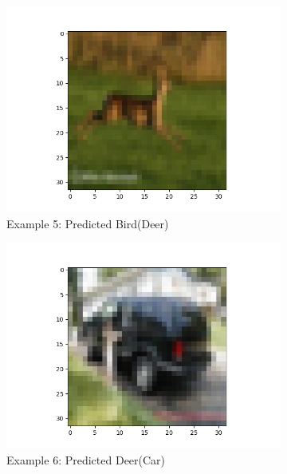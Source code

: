 \documentclass[11pt]{article}
\begin{document}
\begin{figure}[H]
\begin{subfigure}[b]{0.3\textwidth}
        \includegraphics[width=\linewidth]{misA5.png}
        \caption{Example 5: Predicted Bird(Deer)}
    \end{subfigure}
    \begin{subfigure}[b]{0.3\textwidth}
        \centering
        \includegraphics[width=\linewidth]{misA6.png}
        \caption{Example 6: Predicted Deer(Car)}
    \end{subfigure} 
    \medskip
    \begin{subfigure}[b]{0.3\textwidth}
        \centering

\end{subfigure}
\end{figure}
\end{document}
